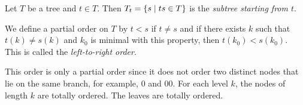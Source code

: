 \begin{definition}
	Let \( T \) be a tree and \( t \in T \).
	Then \( T_t = \qty{s \mid ts \in T} \) is the \emph{subtree starting from \( t \)}.
\end{definition}
\begin{definition}
	We define a partial order on \( T \) by \( t < s \) if \( t \neq s \) and if there exists \( k \) such that \( t(k) \neq s(k) \) and \( k_0 \) is minimal with this property, then \( t(k_0) < s(k_0) \).
	This is called the \emph{left-to-right order}.
\end{definition}
\begin{remark}
	This order is only a partial order since it does not order two distinct nodes that lie on the same branch, for example, \( 0 \) and \( 00 \).
	For each level \( k \), the nodes of length \( k \) are totally ordered.
	The leaves are totally ordered.
\end{remark}

